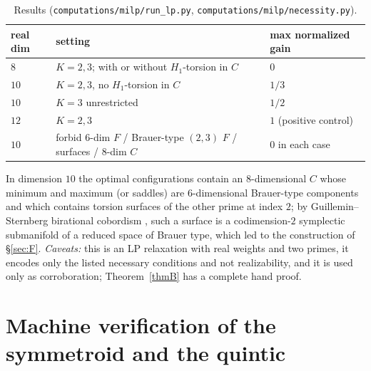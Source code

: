 \documentclass[11pt]{amsart}
\numberwithin{equation}{section}
\theoremstyle{definition}
\theoremstyle{remark}
\begin{document}
\begin{table}[h]
\centering\small
\begin{tabular}{@{}lll@{}}
\toprule
real dim & setting & max normalized gain\\
\midrule
$8$ & $K=2,3$; with or without $H_1$-torsion in $C$ & $0$\\
$10$ & $K=2,3$, no $H_1$-torsion in $C$ & $1/3$\\
$10$ & $K=3$ unrestricted & $1/2$\\
$12$ & $K=2,3$ & $1$ (positive control)\\
$10$ & forbid $6$-dim $F$ / Brauer-type $(2,3)$ $F$ / surfaces / $8$-dim $C$ & $0$ in each case\\
\bottomrule
\end{tabular}
\caption{Results (\nolinkurl{computations/milp/run_lp.py}, \nolinkurl{computations/milp/necessity.py}).}
\end{table}

In dimension $10$ the optimal configurations contain an $8$-dimensional
$C$ whose minimum and maximum (or saddles) are $6$-dimensional
Brauer-type components and which contains torsion surfaces of the other
prime at index $2$; by Guillemin--Sternberg birational cobordism
\cite{GuilleminSternberg1989}, such a surface is a codimension-$2$
symplectic submanifold of a reduced space of Brauer type, which led to the
construction of \S\ref{sec:F}. \emph{Caveats:} this is an LP relaxation
with real weights and two primes, it encodes only the listed necessary
conditions and not realizability, and it is used only as corroboration;
Theorem~\ref{thmB} has a complete hand proof.

\section{Machine verification of the symmetroid and the quintic}\label{app:sage}
\end{document}
